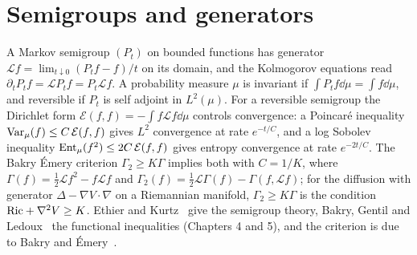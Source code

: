 \section{Semigroups and generators}

A Markov semigroup $(P_t)$ on bounded functions has generator $\mathcal{L}f = \lim_{t\downarrow0}(P_tf-f)/t$ on its domain, and the Kolmogorov equations read $\partial_tP_tf = \mathcal{L}P_tf = P_t\mathcal{L}f$. A probability measure $\mu$ is invariant if $\int P_tf\dd\mu = \int f\dd\mu$, and reversible if $P_t$ is self adjoint in $L^2(\mu)$. For a reversible semigroup the Dirichlet form $\mathcal{E}(f,f) = -\int f\mathcal{L}f\dd\mu$ controls convergence: a Poincar\'e inequality $\mathrm{Var}_\mu(f)\leq C\,\mathcal{E}(f,f)$ gives $L^2$ convergence at rate $e^{-t/C}$, and a log Sobolev inequality $\mathrm{Ent}_\mu(f^2)\leq2C\,\mathcal{E}(f,f)$ gives entropy convergence at rate $e^{-2t/C}$. The Bakry \'Emery criterion $\Gamma_2\geq K\Gamma$ implies both with $C = 1/K$, where $\Gamma(f) = \frac12\mathcal{L}f^2-f\mathcal{L}f$ and $\Gamma_2(f) = \frac12\mathcal{L}\Gamma(f)-\Gamma(f,\mathcal{L}f)$; for the diffusion with generator $\Delta-\nabla V\cdot\nabla$ on a Riemannian manifold, $\Gamma_2\geq K\Gamma$ is the condition $\mathrm{Ric}+\nabla^2V\geq K$. Ethier and Kurtz~\cite{ethier1986} give the semigroup theory, Bakry, Gentil and Ledoux~\cite{bakry2014} the functional inequalities (Chapters 4 and 5), and the criterion is due to Bakry and \'Emery~\cite{bakry1985}.
